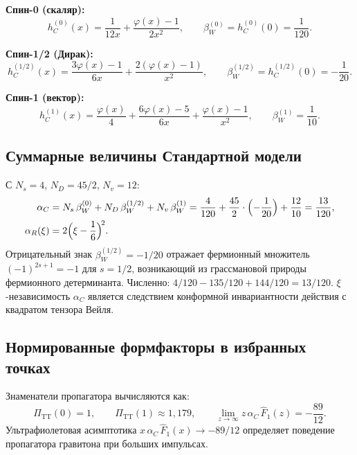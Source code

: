 \documentclass[12pt,a4paper]{article}
\newcommand{\PiTT}{\Pi_{\mathrm{TT}}}
\theoremstyle{plain}
\theoremstyle{definition}
\begin{document}
\noindent\textbf{Спин-0 (скаляр):}
\begin{equation}\label{eq:hC-scalar}
  h_C^{(0)}(x) = \frac{1}{12x} + \frac{\varphi(x) - 1}{2x^2},
  \qquad
  \beta_W^{(0)} = h_C^{(0)}(0) = \frac{1}{120}.
\end{equation}

\noindent\textbf{Спин-1/2 (Дирак):}
\begin{equation}\label{eq:hC-dirac}
  h_C^{(1/2)}(x) = \frac{3\varphi(x) - 1}{6x}
  + \frac{2(\varphi(x) - 1)}{x^2},
  \qquad
  \beta_W^{(1/2)} = h_C^{(1/2)}(0) = -\frac{1}{20}.
\end{equation}

\noindent\textbf{Спин-1 (вектор):}
\begin{equation}\label{eq:hC-vector}
  h_C^{(1)}(x) = \frac{\varphi(x)}{4}
  + \frac{6\varphi(x) - 5}{6x}
  + \frac{\varphi(x) - 1}{x^2},
  \qquad
  \beta_W^{(1)} = \frac{1}{10}.
\end{equation}

\subsection{Суммарные величины Стандартной модели}

С $N_s = 4$, $N_D = 45/2$, $N_v = 12$:
\begin{align}
  \alpha_C &= N_s\,\beta_W^{(0)} + N_D\,\beta_W^{(1/2)}
  + N_v\,\beta_W^{(1)}
  = \frac{4}{120} + \frac{45}{2}\cdot\Bigl(-\frac{1}{20}\Bigr)
  + \frac{12}{10}
  = \frac{13}{120},
  \label{eq:alpha_C-check}\\
  \alpha_R(\xi) &= 2\Bigl(\xi - \frac{1}{6}\Bigr)^{\!2}.
  \label{eq:alpha_R-check}
\end{align}
Отрицательный знак $\beta_W^{(1/2)} = -1/20$ отражает фермионный
множитель $(-1)^{2s+1} = -1$ для $s = 1/2$, возникающий из
грассмановой природы фермионного детерминанта.  Численно: $4/120 - 135/120 + 144/120 = 13/120$.
$\xi$-независимость $\alpha_C$ является следствием конформной
инвариантности действия с квадратом тензора Вейля.

\subsection{Нормированные формфакторы в избранных точках}

Знаменатели пропагатора вычисляются как:
\begin{equation}\label{eq:PiTT-values}
  \PiTT(0) = 1,
  \qquad
  \PiTT(1) \approx 1{,}179,
  \qquad
  \lim_{z \to \infty} z\,\alpha_C\,\hat{F}_1(z)
  = -\frac{89}{12}.
\end{equation}
Ультрафиолетовая асимптотика $x\,\alpha_C\,\hat{F}_1(x) \to -89/12$
определяет поведение пропагатора гравитона при больших импульсах.
\end{document}
